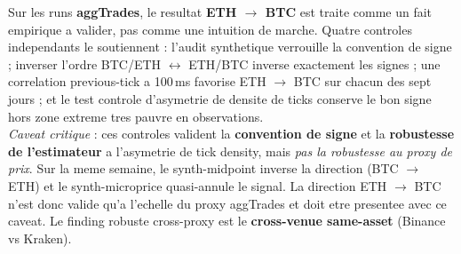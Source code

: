 \small
Sur les runs \textbf{aggTrades}, le resultat \textbf{ETH $\to$ BTC} est traite
comme un fait empirique a valider, pas comme une intuition de marche. Quatre
controles independants le soutiennent : l'audit synthetique verrouille la
convention de signe ; inverser l'ordre BTC/ETH $\leftrightarrow$ ETH/BTC
inverse exactement les signes ; une correlation previous-tick a 100\,ms
favorise ETH $\to$ BTC sur chacun des sept jours ; et le test controle
d'asymetrie de densite de ticks conserve le bon signe hors zone extreme tres
pauvre en observations.
\\[0.3em]
\emph{Caveat critique} : ces controles valident la \textbf{convention de signe}
et la \textbf{robustesse de l'estimateur} a l'asymetrie de tick density, mais
\emph{pas la robustesse au proxy de prix}. Sur la meme semaine, le
synth-midpoint inverse la direction (BTC $\to$ ETH) et le synth-microprice
quasi-annule le signal. La direction ETH $\to$ BTC n'est donc valide qu'a
l'echelle du proxy aggTrades et doit etre presentee avec ce caveat. Le finding
robuste cross-proxy est le \textbf{cross-venue same-asset} (Binance vs Kraken).
